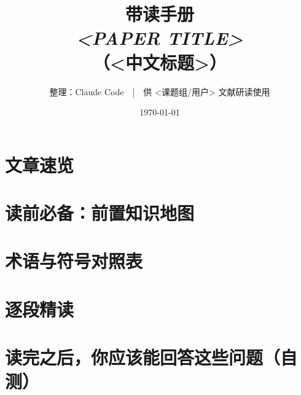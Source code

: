\documentclass[11pt]{ctexart}
\title{\bfseries 带读手册\\[4pt]\large \textit{<PAPER TITLE>}\\[2pt]\normalsize （<中文标题>）}
\author{整理：Claude Code\ \ |\ \ 供 <课题组/用户> 文献研读使用}
\date{\today}
\begin{document}
\maketitle
\tableofcontents
\newpage

\section{文章速览}

\section{读前必备：前置知识地图}\label{sec:prereq}

\section{术语与符号对照表}

\section{逐段精读}
%

\section{读完之后，你应该能回答这些问题（自测）}

\begin{tip}[写作层面的启发]
\end{tip}
\end{document}

